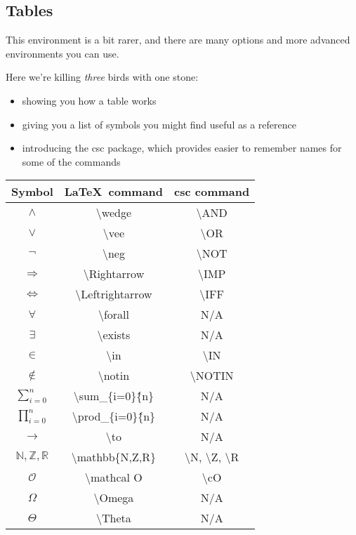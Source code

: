 \documentclass[12pt]{article}
\begin{document}
\subsection{Tables}
This environment is a bit rarer, and there are many options and more advanced environments you can use.

Here we're killing \emph{three} birds with one stone:
\begin{itemize}
  \item showing you how a table works
  \item giving you a list of symbols you might find useful as a reference
  \item introducing the csc package, which provides easier to remember names for some of the commands
\end{itemize}

\vspace{5pt}

\begin{tabular}{c c c}  %

Symbol & \LaTeX\ command & csc command \\

\hline

$\wedge$ & \textbackslash wedge & \textbackslash AND \\
$\vee$ & \textbackslash vee & \textbackslash OR \\
$\neg$ & \textbackslash neg & \textbackslash NOT \\
$\Rightarrow$ & \textbackslash Rightarrow & \textbackslash IMP \\
$\Leftrightarrow$ & \textbackslash Leftrightarrow & \textbackslash IFF \\
$\forall$ & \textbackslash forall & N/A \\
$\exists$ & \textbackslash exists & N/A \\
$\in$ & \textbackslash in & \textbackslash IN \\ %
$\notin$ & \textbackslash notin & \textbackslash NOTIN \\
$\sum_{i=0}^{n}$ & \textbackslash sum\_\{i=0\}\^\{n\} & N/A \\ %
$\prod_{i=0}^{n}$ & \textbackslash prod\_\{i=0\}\^\{n\} & N/A \\
$\to$ & \textbackslash to & N/A \\
$\mathbb{N,Z,R}$ & \textbackslash mathbb\{N,Z,R\} & \textbackslash N, \textbackslash Z, \textbackslash R \\
$\mathcal O$ & \textbackslash mathcal O & \textbackslash cO \\
$\Omega$ & \textbackslash Omega & N/A \\   %
$\Theta$ & \textbackslash Theta & N/A      %
\end{tabular}
\end{document}
